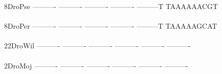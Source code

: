 \documentclass[11pt,twoside,reqno,a4paper]{article}
\begin{document}
{8\hspace*{4\charwidth}DroPse	----------	----------	----------	----------	---------T	TAAAAAACGT	\\
\hspace*{5\charwidth}\hspace*{7\charwidth}\hspace*{1\charwidth}\hspace*{1\charwidth}\hspace*{1\charwidth}\hspace*{1\charwidth}\hspace*{1\charwidth}\hspace*{1\charwidth}\\
8\hspace*{4\charwidth}DroPer	----------	----------	----------	----------	---------T	TAAAAAGCAT	\\
\hspace*{5\charwidth}\hspace*{7\charwidth}\hspace*{1\charwidth}\hspace*{1\charwidth}\hspace*{1\charwidth}\hspace*{1\charwidth}\hspace*{1\charwidth}\hspace*{1\charwidth}\\
22\hspace*{3\charwidth}DroWil	----------	----------	----------	----------	----------	----------	\\
\hspace*{5\charwidth}\hspace*{7\charwidth}\hspace*{1\charwidth}\hspace*{1\charwidth}\hspace*{1\charwidth}\hspace*{1\charwidth}\hspace*{1\charwidth}\hspace*{1\charwidth}\\
2\hspace*{4\charwidth}DroMoj	----------	----------	----------	----------	----------	----------	\\
\hspace*{5\charwidth}\hspace*{7\charwidth}\hspace*{1\charwidth}\hspace*{1\charwidth}\hspace*{1\charwidth}\hspace*{1\charwidth}\hspace*{1\charwidth}\hspace*{1\charwidth}\\
}
\end{document}
